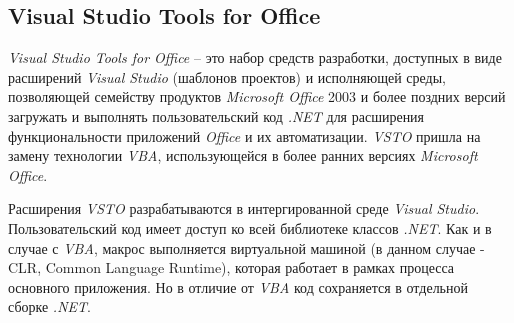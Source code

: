 \subsection{Visual Studio Tools for Office}

{\it Visual Studio Tools for Office} -- это набор средств разработки, доступных в виде расширений {\it Visual Studio} (шаблонов проектов) и исполняющей среды, позволяющей  семейству продуктов {\it Microsoft Office} 2003 и более поздних версий загружать и выполнять пользовательский код {\it .NET} для расширения функциональности приложений {\it Office} и их автоматизации. {\it VSTO} пришла на замену технологии {\it VBA}, использующейся в более ранних версиях {\it Microsoft Office}. 

Расширения {\it VSTO} разрабатываются в интергированной среде {\it Visual Studio}. Пользовательский код имеет доступ ко всей библиотеке классов {\it .NET}. Как и в случае с {\it VBA}, макрос выполняется виртуальной машиной (в данном случае - CLR, Common Language Runtime), которая работает в рамках процесса основного приложения. Но в отличие от {\it VBA} код сохраняется в отдельной сборке {\it .NET}.
